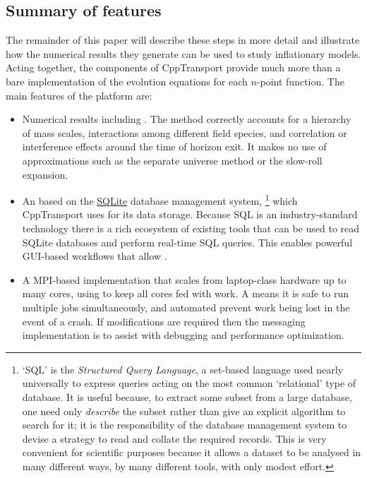 \documentclass[11pt,a4paper]{article}
\newcommand{\packagefont}{\sffamily}
\newcommand{\CppTransport}{{\packagefont CppTransport}}
\newcommand{\MPI}{{\packagefont MPI}}
\newcommand{\SQLite}{{\packagefont SQLite}}
\newcommand{\semibold}[1]{{\fontseries{b}\selectfont{#1}}}
\begin{document}
\subsection{Summary of features}
The remainder of this paper will describe these steps
in more detail
and illustrate how the numerical results they generate can be
used to study inflationary models.
Acting together, the components
of {\CppTransport} provide much more than a bare implementation
of the evolution equations for each $n$-point function.
The main features of the platform are:
\begin{itemize}
    \item Numerical results including \semibold{all relevant
    field-theory effects at tree-level}.
    The method correctly accounts for
    a hierarchy of mass scales,
    interactions among different field species,
    and correlation or interference effects
    around the time of horizon exit.
    It makes no use of approximations
    such as the separate universe method or the slow-roll
    expansion.
    
    \item An \semibold{SQL-based workflow} based on
    the \href{http://sqlite.org}{\SQLite} database
    management system,%
        \footnote{`SQL' is the \emph{Structured Query Language},
        a set-based language used nearly universally
        to express queries acting on the most common `relational' type
        of database. It is useful because, to extract
        some subset from a large database, one need only \emph{describe}
        the subset rather than give an explicit algorithm to search for it;
        it is the responsibility of the database management system
        to devise a strategy to read and collate the required records.
        This is very convenient for
        scientific purposes
        because it allows a dataset to be analysed in
        many different ways, by many different tools,
        with only modest effort.}
    which
    {\CppTransport} uses for its data storage.
    Because SQL is an industry-standard technology
    there is a rich ecosystem of existing
    tools that can be used to
    read SQLite databases and perform real-time SQL queries.
    This enables powerful GUI-based workflows that allow
    \semibold{scientific exploitation and analysis without
    extensive programming}.

    \item A \semibold{fully parallelized} {\MPI}-based implementation that
    scales from laptop-class hardware up to many cores, using
    \semibold{adaptive load-balancing} to keep all cores fed with work.
    A \semibold{transactional design} means it is safe to run multiple
    jobs simultaneously,
    and automated \semibold{checkpointing and recovery} prevent
    work being lost in the event of a crash.
    If modifications are required then the messaging implementation is
    \semibold{automatically instrumented} to assist with debugging and
    performance optimization.
    

\end{itemize}
\end{document}
